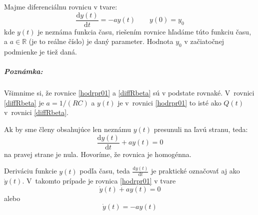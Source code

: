 \documentclass[a4paper, 10pt, ]{article}
\begin{document}
Majme diferenciálnu rovnicu v tvare:
\begin{equation} \label{hodrpr01}
    \frac{\text{d}y(t)}{\text{d}t} = - a y(t) \qquad y(0)=y_0
\end{equation}
kde $y(t)$ je neznáma funkcia času, riešením rovnice hľadáme túto funkciu času, a $a\in\mathbb{R}$ (je to reálne číslo) je daný parameter. Hodnota $y_0$ v začiatočnej podmienke je tiež daná.

\subparagraph{Poznámka:} Všimnime si, že rovnice \eqref{hodrpr01} a \eqref{diffRbeta} sú v podstate rovnaké. V~rovnici \eqref{diffRbeta} je $a = 1/(RC)$ a $y(t)$ je v~rovnici \eqref{hodrpr01} to isté ako $Q(t)$ v~rovnici \eqref{diffRbeta}.

Ak by sme členy obsahujúce len neznámu $y(t)$ presunuli na ľavú stranu, teda:
\begin{equation}
    \frac{\text{d}y(t)}{\text{d}t} + a y(t) = 0
\end{equation}
na pravej strane je nula. Hovoríme, že rovnica je homogénna.

Deriváciu funkcie $y(t)$ podľa času, teda $\frac{\text{d}y(t)}{\text{d}t}$ je praktické označovať aj ako $\dot y(t)$. V~takomto prípade je rovnica \eqref{hodrpr01} v tvare
\begin{equation} \label{eq:HDR1R}
    \dot y(t) + a y(t) = 0 
\end{equation}
alebo 
\begin{equation} \label{eq:HDR1Rs}
    \dot y(t) = - a y(t)
\end{equation}
\end{document}
